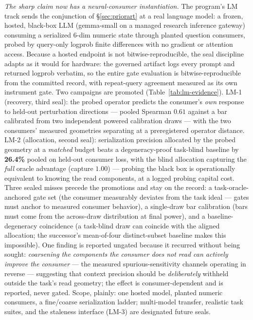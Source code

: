 \documentclass{article}
\theoremstyle{definition}
\theoremstyle{remark}
\begin{document}
\emph{The sharp claim now has a neural-consumer instantiation.} The
program's LM track sends the conjunction of \S\ref{sec:priorart} at a
real language model: a frozen, hosted, black-box LLM (gemma-small on a
managed research inference gateway) consuming a serialized 6-dim
numeric state through planted question consumers, probed by query-only
logprob finite differences with no gradient or attention access.
Because a hosted endpoint is not bitwise-reproducible, the seal
discipline adapts as it would for hardware: the governed artifact logs
every prompt and returned logprob verbatim, so the entire gate
evaluation is bitwise-reproducible from the committed record, with
repeat-query agreement measured as its own instrument gate. Two
campaigns are promoted (Table~\ref{tab:lm-evidence}). LM-1
(recovery, third seal): the probed operator predicts the consumer's
\emph{own} response to held-out perturbation directions --- pooled
Spearman $0.61$ against a bar calibrated from two independent powered
calibration draws --- with the two consumers' measured geometries
separating at a preregistered operator distance. LM-2 (allocation,
second seal): serialization precision allocated by the probed
geometry at a \emph{matched} budget beats a degeneracy-proof
task-blind baseline by \textbf{26.4\%} pooled on held-out consumer
loss, with the blind allocation capturing the \emph{full} oracle
advantage (capture $1.00$) --- probing the black box is operationally
equivalent to knowing the read components, at a logged probing
capital cost. Three sealed misses precede the promotions and stay on
the record: a task-oracle-anchored gate set (the consumer measurably
deviates from the task ideal --- gates must anchor to measured
consumer behavior), a single-draw bar calibration (bars must come
from the across-draw distribution at final power), and a
baseline-degeneracy coincidence (a task-blind draw can coincide with
the aligned allocation; the successor's mean-of-four distinct-subset
baseline makes this impossible). One finding is reported ungated
because it recurred without being sought: \emph{coarsening the
components the consumer does not read can actively improve the
consumer} --- the measured spurious-sensitivity channels operating in
reverse --- suggesting that context precision should be
\emph{deliberately} withheld outside the task's read geometry;
the effect is consumer-dependent and is reported, never gated. Scope,
plainly: one hosted model, planted numeric consumers, a fine/coarse
serialization ladder; multi-model transfer, realistic task suites,
and the staleness interface (LM-3) are designated future seals.
\end{document}
